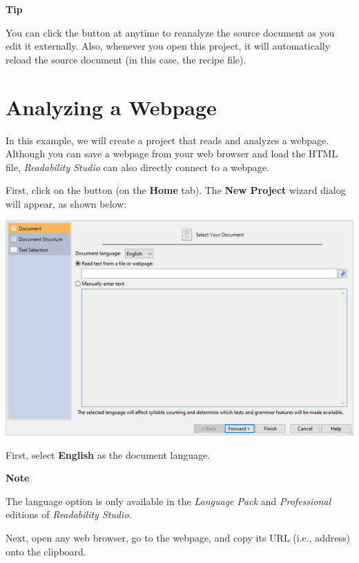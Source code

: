 \documentclass[
]{book}
\newenvironment{tipsection}
    {
    \begin{tcolorbox}[colframe=lightgray,colback=lightyellow,arc=3mm]
    \faLightbulb[regular] \textbf{Tip} \newline
    }
    {
    \end{tcolorbox}
    }
\newenvironment{notesection}
    {
    \begin{tcolorbox}[colframe=mediumblue,colback=lightblue,coltext=mediumblue,arc=3mm]
    \faLightbulb[regular] \textbf{Note} \newline
    }
    {
    \end{tcolorbox}
    }
\theoremstyle{definition}
\theoremstyle{definition}
\theoremstyle{definition}
\theoremstyle{definition}
\theoremstyle{remark}
\begin{document}
\begin{tipsection}
You can click the  button at anytime to reanalyze the source document as you edit it externally. Also, whenever you open this project, it will automatically reload the source document (in this case, the recipe file).

\end{tipsection}

\hypertarget{analyzing-a-webpage}{%
\section{Analyzing a Webpage}\label{analyzing-a-webpage}}

In this example, we will create a project that reads and analyzes a webpage. Although you can save a webpage from your web browser and load the HTML file, \emph{Readability Studio} can also directly connect to a webpage.

First, click on the  button (on the \textbf{Home} tab). The \textbf{New Project} wizard dialog will appear, as shown below:

\includegraphics{Images/wizard1.png}

First, select \textbf{English} as the document language.

\begin{notesection}
The language option is only available in the \emph{Language Pack} and \emph{Professional} editions of \emph{Readability Studio}.

\end{notesection}

Next, open any web browser, go to the webpage, and copy its URL (i.e., address) onto the clipboard.
\end{document}
